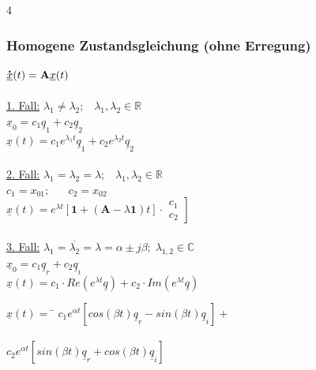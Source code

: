 \documentclass[6pt,a4paper]{scrartcl}
\renewcommand*{\dot}[1]{\accentset{\mbox{\textrm{\large\bfseries .}} }{#1}}                     %
\begin{document}
\begin{multicols*}{4}
    \subsubsection*{Homogene Zustandsgleichung (ohne Erregung)}
    $\dot {\underline{x}}(t)=\textbf{A}\underline{x}(t)$\\\\
    \underline{1. Fall:} $\lambda_1 \ne \lambda_2;\;\;\;\lambda_1,\lambda_2\in \mathbb{R}$\\
    $\underline{x}_0=c_1\underline{q}_1+c_2\underline{q}_2$\\
    $\underline{x}(t)=c_1e^{\lambda_1t}\underline{q}_1+c_2e^{\lambda_2t}\underline{q}_2$\\\\
    \underline{2. Fall:} $\lambda_1 = \lambda_2=\lambda;\;\;\;\lambda_1,\lambda_2\in \mathbb{R}$\\
    $c_1=x_{01};\;\;\;\;\;\;c_2=x_{02}$\\
    $\underline{x}(t)=e^{\lambda t}[\textbf{1}+(\textbf{A}-\lambda \textbf{1})t]\cdot\left.\begin{matrix}c_1 \\ c_2\end{matrix}\right]$\\\\
    \underline{3. Fall:} $\lambda_1=\overline{\lambda_2}=\lambda =\alpha \pm j\beta;\;\lambda_{1,2}\in \mathbb{C}$\\
    $\underline{x}_0=c_1\underline{q}_r+c_2\underline{q}_i$\\
    $\underline{x}(t)=c_1\cdot Re(e^{\lambda t}\underline{q})+c_2\cdot Im(e^{\lambda t}\underline{q})$
    \begin{tabbing}
        $\underline{x}(t)=$ \= $c_1e^{\alpha t}[cos(\beta t)\underline{q}_r-sin(\beta t)\underline{q}_i]+$\\\\
        \> $c_2e^{\alpha t}[sin(\beta t)\underline{q}_r+cos(\beta t)\underline{q}_i]$
    \end{tabbing}
    \fi




\end{multicols*}
\end{document}
